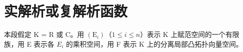 \section{实解析或复解析函数}

本段假定 K = R 或 C。用 \((\mathrm{E}_{i})\)（\(1 \leqslant i \leqslant n\)）表示 K 上赋范空间的一个有限族，用 E 表示各 \(E_{i}\) 的乘积空间，用 F 表示 K 上的分离局部凸拓扑向量空间。

